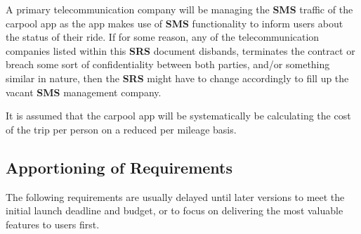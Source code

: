 \documentclass[]{article}
\begin{document}
A primary telecommunication company will be managing the \textbf{SMS} traffic of the carpool app as the app makes use of \textbf{SMS} functionality to inform users about the status of their ride. If for some reason, any of the telecommunication companies listed within this \textbf{SRS} document disbands, terminates the contract or breach some sort of confidentiality between both parties, and/or something similar in nature, then the \textbf{SRS} might have to change accordingly to fill up the vacant \textbf{SMS} management company.

It is assumed that the carpool app will be systematically be calculating the cost of the trip per person on a reduced per mileage basis. 

\subsection{Apportioning of Requirements}
\label{sub:apportioning_of_requirements}
The following requirements are usually delayed until later versions to meet the initial launch deadline and budget, or to focus on delivering the most valuable features to users first.
\end{document}
